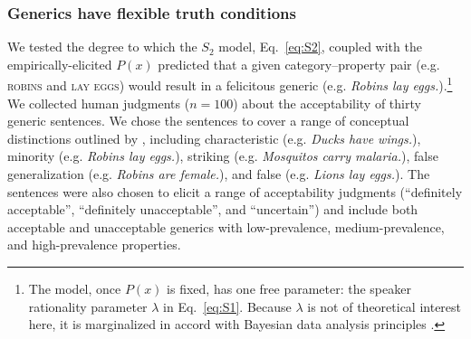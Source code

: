 \documentclass[10pt,letterpaper]{article}
\newcommand{\ndg}[1]{\textcolor{Green}{[ndg: #1]}}
\begin{document}
\subsubsection*{Generics have flexible truth conditions} 

We tested the degree to which the $S_2$ model, Eq.~\ref{eq:S2}, coupled with the empirically-elicited $P(x)$ predicted that a given category--property pair (e.g. \textsc{robins} and \textsc{lay eggs}) would result in a felicitous generic (e.g. \emph{Robins lay eggs.}).\footnote{The model, once $P(x)$ is fixed, has one free parameter: the speaker rationality parameter $\lambda$ in Eq.~\ref{eq:S1}. Because $\lambda$ is not of theoretical interest here, it is marginalized in accord with Bayesian data analysis principles \cite{LW2014}. } 
We collected human judgments ($n=100$) about the acceptability of thirty generic sentences. 
We chose the sentences to cover a range of conceptual distinctions outlined by , including characteristic (e.g. \emph{Ducks have wings.}), minority (e.g. \emph{Robins lay eggs.}), striking (e.g. \emph{Mosquitos carry malaria.}), false generalization (e.g. \emph{Robins are female.}), and false (e.g. \emph{Lions lay eggs.}).
The sentences were also chosen to elicit a range of acceptability judgments (``definitely acceptable'', ``definitely unacceptable'', and ``uncertain'') and include both acceptable and unacceptable generics with low-prevalence, medium-prevalence, and high-prevalence properties.
%

\end{document}
